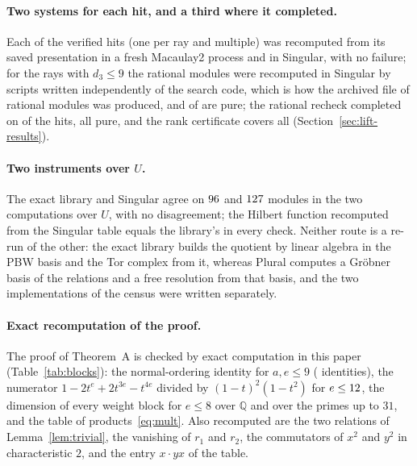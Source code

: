 \documentclass[11pt]{article}
\theoremstyle{definition}
\theoremstyle{remark}
\newcommand{\Q}{\mathbb{Q}}
\begin{document}
\paragraph{Two systems for each hit, and a third where it completed.} Each of the \nverified{} verified hits (one per ray and multiple) was recomputed from its saved presentation in a fresh Macaulay2 process and in Singular, with no failure; for the rays with $d_3\le9$ the rational modules were recomputed in Singular by scripts written independently of the search code, which is how the archived file of rational modules was produced, and \nqqModules{} of \nqqModules{} are pure; the rational recheck completed on \nqqOk{} of the \nverified{} hits, all pure, and the rank certificate covers all \nverified{} (Section~\ref{sec:lift-results}).

\paragraph{Two instruments over $U$.} The exact library and Singular agree on $96{}$ and $127{}$ modules in the two computations over $U$, with no disagreement; the Hilbert function recomputed from the Singular table equals the library's in every check. Neither route is a re-run of the other: the exact library builds the quotient by linear algebra in the PBW basis and the Tor complex from it, whereas Plural computes a Gr\"obner basis of the relations and a free resolution from that basis, and the two implementations of the census were written separately.

\paragraph{Exact recomputation of the proof.} The proof of Theorem~A is checked by exact computation in this paper (Table~\ref{tab:blocks}): the normal-ordering identity for $a,e\le9$ (\nnormalOrderingCount{} identities), the numerator $1-2t^e+2t^{3e}-t^{4e}$ divided by $(1-t)^2(1-t^2)$ for $e\le12$, the dimension of every weight block for $e\le8$ over $\Q$ and over the primes up to $31$, and the table of products~\eqref{eq:mult}. Also recomputed are the two relations of Lemma~\ref{lem:trivial}, the vanishing of $r_1$ and $r_2$, the commutators of $x^2$ and $y^2$ in characteristic $2$, and the entry $x\cdot yx$ of the table.
\end{document}
